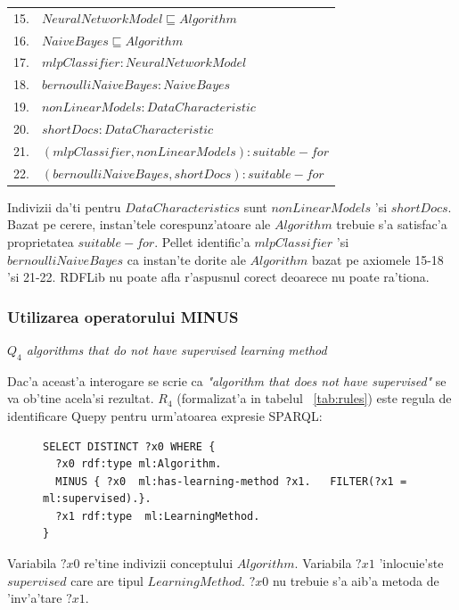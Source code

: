 \documentclass[12pt,a4paper,twoside]{report}
\begin{document}
\vspace*{0.3cm}
\begin{small}
\begin{tabular}{ll}
15. & $NeuralNetworkModel  \sqsubseteq Algorithm$\\
16. & $NaiveBayes  \sqsubseteq Algorithm$\\
17. & $mlpClassifier:NeuralNetworkModel$\\
18. & $bernoulliNaiveBayes: NaiveBayes$\\
19. & $nonLinearModels: DataCharacteristic$\\
20. & $shortDocs: DataCharacteristic$\\
21. & $(mlpClassifier, nonLinearModels):suitable-for$\\
22. & $(bernoulliNaiveBayes, shortDocs):suitable-for$\\
\end{tabular}
\end{small}
\vspace*{0.3cm}

Indivizii da'ti pentru $DataCharacteristics$ sunt $nonLinearModels$ 'si $shortDocs$. Bazat pe cerere, instan'tele corespunz'atoare ale $Algorithm$ trebuie s'a satisfac'a proprietatea $suitable-for$. Pellet identific'a $mlpClassifier$ 'si $bernoulliNaiveBayes$ ca instan'te dorite ale $Algorithm$ bazat pe axiomele 15-18 'si 21-22. 
RDFLib nu poate afla r'aspusnul corect deoarece nu poate ra'tiona.
\subsubsection{Utilizarea operatorului MINUS}
{\it $Q_4$ algorithms that do not have supervised learning method}

Dac'a aceast'a interogare se scrie ca {\it"algorithm that does not have supervised"} se va ob'tine acela'si rezultat. $R_4$ (formalizat'a in tabelul ~\ref{tab:rules}) este regula de identificare Quepy pentru urm'atoarea expresie SPARQL:

\begin{figure}[h]
\begin{footnotesize}
\begin{lstlisting}[captionpos=b, caption=Q4 SPARQL query, label=lst:sparql,  basicstyle=\ttfamily,frame=single]
SELECT DISTINCT ?x0 WHERE {
  ?x0 rdf:type ml:Algorithm.
  MINUS { ?x0  ml:has-learning-method ?x1.   FILTER(?x1 = ml:supervised).}.
  ?x1 rdf:type  ml:LearningMethod.
}
\end{lstlisting}
\end{footnotesize}
\end{figure}
Variabila $?x0$ re'tine indivizii conceptului $Algorithm$. Variabila $?x1$ 'inlocuie'ste $supervised$ care are tipul $LearningMethod$. $?x0$ nu trebuie s'a aib'a metoda de 'inv'a'tare $?x1$.
\end{document}
